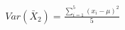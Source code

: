 \documentclass[preview]{standalone}
\begin{document}
\begin{align*}
Var(\bar{X}_2) = \frac{\sum_{i=1}^{5}(x_i - \mu)^2}{5}
\end{align*}
\end{document}
